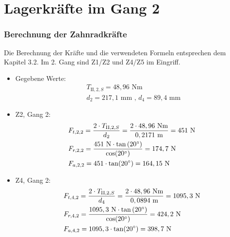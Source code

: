 \section{Lagerkräfte im Gang 2}
\subsubsection{Berechnung der Zahnradkräfte}
Die Berechnung der Kräfte und die verwendeten Formeln entsprechen dem Kapitel 3.2. Im 2. Gang sind Z1/Z2 und Z4/Z5 im Eingriff.
\begin{itemize}
\item Gegebene Werte: 
	\begin{align*}
	&T_{\mathrm{II},2,S} = 48,96\text{ Nm} \\
	&d_2 = 217,1\text{ mm} \text{ , } d_4 = 89,4 \text{ mm } 
	\end{align*}
\item Z2, Gang 2:
	\begin{align*} 
	&F_{t,2,2} = \frac{2\cdot T_{\mathrm{II},2,S}}{d_2} = \frac{2 \cdot 48,96 \text{ Nm}}{0,2171 \text{ m}} = 451 \text{ N}\\ 
	&F_{r,2,2} = \frac{451 \text{ N} \cdot \tan{(20^\circ)}}{\cos(20^\circ)} = 174,7\text{ N}\\ 
	&F_{a,2,2} =451 \cdot \tan(20^\circ) =164,15 \text{ N}
	\end{align*}
\item Z4, Gang 2:
	\begin{align*} 
	&F_{t,4,2} = \frac{2\cdot T_{\mathrm{II},2,S}}{d_4} = \frac{2 \cdot 48,96 \text{ Nm}}{0,0894 \text{ m}} = 1095,3 \text{ N}\\ 
	&F_{r,4,2} = \frac{1095,3 \text{ N} \cdot \tan{(20^\circ)}}{\cos(20^\circ)} = 424,2\text{ N}\\ 
	&F_{a,4,2} =1095,3 \cdot \tan(20^\circ) =398,7 \text{ N}
	\end{align*}
\end{itemize}
